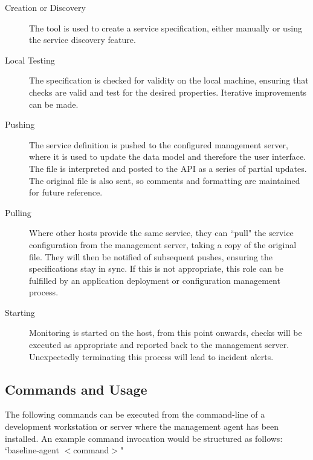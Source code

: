\documentclass{cshonours}
\begin{document}
\begin{description}
  \item[Creation or Discovery] The tool is used to create a service specification, either manually or using the service discovery feature.
  \item[Local Testing] The specification is checked for validity on the local machine, ensuring that checks are valid and test for the desired properties. Iterative improvements can be made.
  \item[Pushing] The service definition is pushed to the configured management server, where it is used to update the data model and therefore the user interface. The file is interpreted and posted to the API as a series of partial updates. The original file is also sent, so comments and formatting are maintained for future reference.
  \item[Pulling] Where other hosts provide the same service, they can ``pull" the service configuration from the management server, taking a copy of the original file. They will then be notified of subsequent pushes, ensuring the specifications stay in sync. If this is not appropriate, this role can be fulfilled by an application deployment or configuration management process.
  \item[Starting] Monitoring is started on the host, from this point onwards, checks will be executed as appropriate and reported back to the management server. Unexpectedly terminating this process will lead to incident alerts.
\end{description}

\subsection{Commands and Usage}

The following commands can be executed from the command-line of a development workstation or server where the management agent has been installed. An example command invocation would be structured as follows: `baseline-agent $<$command$>$"
\end{document}
